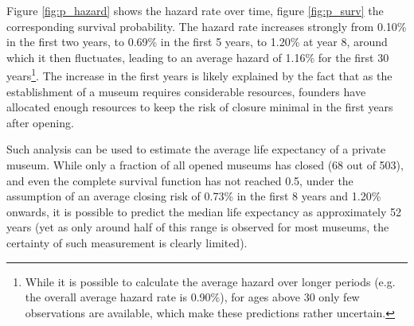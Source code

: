 \documentclass[12pt]{article}
\begin{document}
Figure \ref{fig:p_hazard} shows the hazard rate over time, figure \ref{fig:p_surv} the corresponding survival probability.
The hazard rate increases strongly from 0.10\% in the first two years, to 0.69\% in the first 5 years, to 1.20\% at year 8, around which it then fluctuates, leading to an average hazard of 1.16\% for the first 30 years\footnote{While it is possible to calculate the average hazard over longer periods (e.g. the overall average hazard rate is 0.90\%), for ages above 30 only few observations are available, which make these predictions rather uncertain.}.
The increase in the first years is likely explained by the fact that as the establishment of a museum requires considerable resources, founders have allocated enough resources to keep the risk of closure minimal in the first years after opening.

Such analysis can be used to estimate the average life expectancy of a private museum.
While only a fraction of all opened museums has closed (68 out of 503), and even the complete survival function has not reached 0.5, under the assumption of an average closing risk of 0.73\% in the first 8 years and 1.20\% onwards, it is possible to predict the median life expectancy as approximately 52 years (yet as only around half of this range is observed for most museums, the certainty of such measurement is clearly limited).
\end{document}
